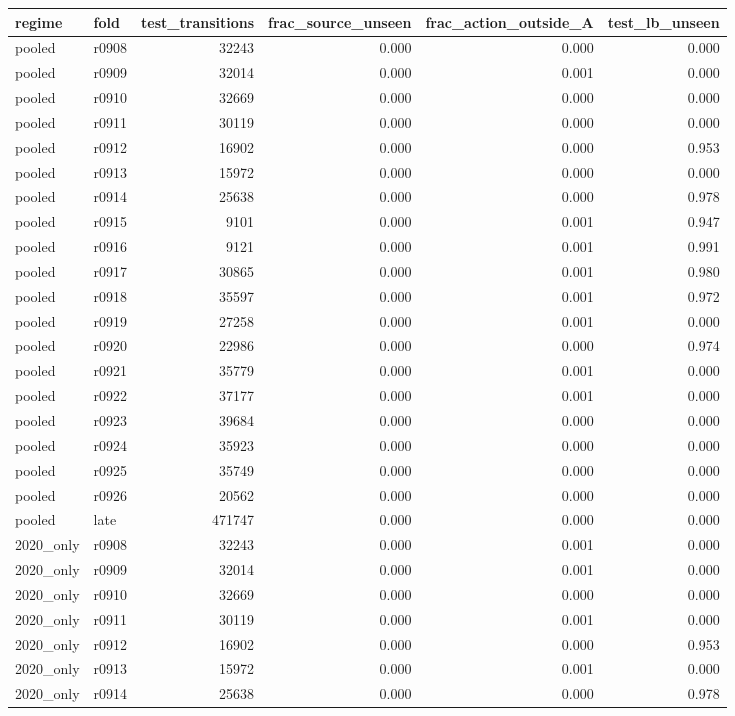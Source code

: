 \begin{tabular}{llrrrr}
\toprule
regime & fold & test_transitions & frac_source_unseen & frac_action_outside_A & test_lb_unseen \\
\midrule
pooled & r0908 & 32243 & 0.000 & 0.000 & 0.000 \\
pooled & r0909 & 32014 & 0.000 & 0.001 & 0.000 \\
pooled & r0910 & 32669 & 0.000 & 0.000 & 0.000 \\
pooled & r0911 & 30119 & 0.000 & 0.000 & 0.000 \\
pooled & r0912 & 16902 & 0.000 & 0.000 & 0.953 \\
pooled & r0913 & 15972 & 0.000 & 0.000 & 0.000 \\
pooled & r0914 & 25638 & 0.000 & 0.000 & 0.978 \\
pooled & r0915 & 9101 & 0.000 & 0.001 & 0.947 \\
pooled & r0916 & 9121 & 0.000 & 0.001 & 0.991 \\
pooled & r0917 & 30865 & 0.000 & 0.001 & 0.980 \\
pooled & r0918 & 35597 & 0.000 & 0.001 & 0.972 \\
pooled & r0919 & 27258 & 0.000 & 0.001 & 0.000 \\
pooled & r0920 & 22986 & 0.000 & 0.000 & 0.974 \\
pooled & r0921 & 35779 & 0.000 & 0.001 & 0.000 \\
pooled & r0922 & 37177 & 0.000 & 0.001 & 0.000 \\
pooled & r0923 & 39684 & 0.000 & 0.000 & 0.000 \\
pooled & r0924 & 35923 & 0.000 & 0.000 & 0.000 \\
pooled & r0925 & 35749 & 0.000 & 0.000 & 0.000 \\
pooled & r0926 & 20562 & 0.000 & 0.000 & 0.000 \\
pooled & late & 471747 & 0.000 & 0.000 & 0.000 \\
2020_only & r0908 & 32243 & 0.000 & 0.001 & 0.000 \\
2020_only & r0909 & 32014 & 0.000 & 0.001 & 0.000 \\
2020_only & r0910 & 32669 & 0.000 & 0.000 & 0.000 \\
2020_only & r0911 & 30119 & 0.000 & 0.001 & 0.000 \\
2020_only & r0912 & 16902 & 0.000 & 0.000 & 0.953 \\
2020_only & r0913 & 15972 & 0.000 & 0.001 & 0.000 \\
2020_only & r0914 & 25638 & 0.000 & 0.000 & 0.978 \\

\end{tabular}
